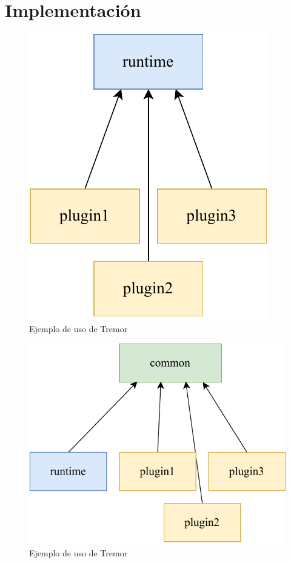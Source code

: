 
\chapter{Implementación}


\begin{figure}
    \centering
    \includegraphics[width=\textwidth]{./Imagenes/separation-temporary.pdf}
    \caption{Ejemplo de uso de Tremor}%
    \label{fig:example_tremor}
\end{figure}

\begin{figure}
    \centering
    \includegraphics[width=\textwidth]{./Imagenes/separation.pdf}
    \caption{Ejemplo de uso de Tremor}%
    \label{fig:example_tremor}
\end{figure}

